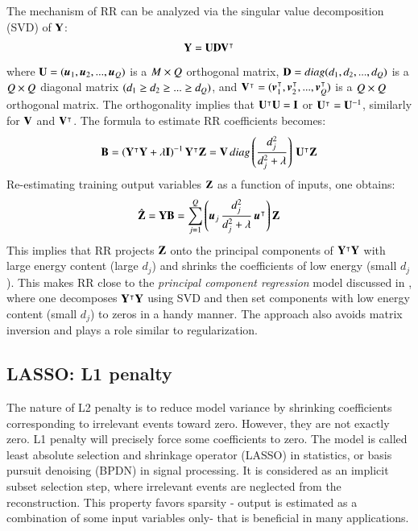 The mechanism of RR can be analyzed via the singular value decomposition (SVD) of $ \mathbf{Y} $: 
\begin{equation}
\mathbf{Y}= \mathbf{U}\mathbf{D}\mathbf{V}^{\intercal}
\label{eq:RR3}
\end{equation}
where $ \mathbf{U}=(\operatorname{\boldsymbol{u}}_1, \operatorname{\boldsymbol{u}}_2,... ,\operatorname{\boldsymbol{u}}_{Q}) $ is a $ M \times Q $ orthogonal matrix, $ \mathbf{D} = diag(d_1, d_2, ... , d_{Q} )$ is a $ Q \times Q $ diagonal matrix $ (d_1 \geq d_2 \geq ... \geq d_{Q}) $, and $ \mathbf{V}^{\intercal}=(\operatorname{\boldsymbol{v}}_1^{\intercal}, \operatorname{\boldsymbol{v}}_2^{\intercal},... ,\operatorname{\boldsymbol{v}}_{Q}^{\intercal}) $ is a $ Q \times Q $ orthogonal matrix. The orthogonality implies that $ \mathbf{U}^{\intercal}\mathbf{U} = \mathbf{I} $ or $ \mathbf{U}^{\intercal}=\mathbf{U}^{-1} $, similarly for $ \mathbf{V} $ and $ \mathbf{V}^{\intercal} $. The formula to estimate RR coefficients becomes:
\begin{equation}
\mathbf{B} =\left(\mathbf{Y}^{\intercal} \mathbf{Y} + \lambda \mathbf{I}\right)^{-1}\mathbf{Y}^{\intercal}\mathbf{Z} = \mathbf{V} \, diag \left( \frac{d_j^2}{d_j^2+\lambda} \right) \, \mathbf{U}^{\intercal} \mathbf{Z}
\label{eq:RR6}
\end{equation}
Re-estimating training output variables $ \mathbf{Z} $ as a function of inputs, one obtains:
\begin{equation}
\operatorname{\hat{\mathbf{Z}}} = \mathbf{Y}\mathbf{B} = \sum\limits_{j=1}^{Q} \left( \operatorname{\boldsymbol{u}}_j \frac{d_j^2}{d_j^2 + \lambda} \operatorname{\boldsymbol{u}}^{\intercal}\right)\mathbf{Z}
\label{eq:RR8}
\end{equation}
This implies that RR projects $ \mathbf{Z} $ onto the principal components of $ \mathbf{Y}^{\intercal}\mathbf{Y} $ with large energy content (large $ d_j $) and shrinks the coefficients of low energy (small $ d_j $). This makes RR close to the \textit{principal component regression} model discussed in \citet{jolliffe1982note}, where one decomposes $ \mathbf{Y}^{\intercal}\mathbf{Y} $ using SVD and then set components with low energy content (small $ d_j $) to zeros in a handy manner. The approach also avoids matrix inversion and plays a role similar to regularization.

\subsection{LASSO: L1 penalty}
\label{sec:l1_penalty}
The nature of L2 penalty  is to reduce model variance by shrinking coefficients corresponding to irrelevant events toward zero. However, they are not exactly zero. L1 penalty will precisely force some coefficients to zero. The model is called least absolute selection and shrinkage operator (LASSO) \citep{tibshirani1996regression} in statistics, or basis pursuit denoising (BPDN) \citep{chen1998atomic} in signal processing. It is considered as an implicit subset selection step, where irrelevant events are neglected from the reconstruction. This property favors sparsity - output is estimated as a combination of some input variables only- that is beneficial in many applications.

